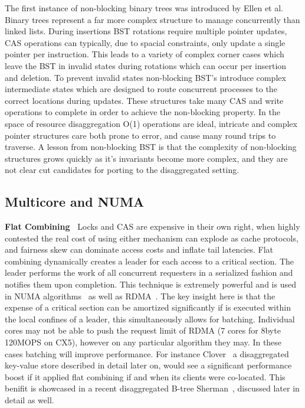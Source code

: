 The first instance of non-blocking binary trees was introduced by Ellen et al.
Binary trees represent a far more complex structure to manage concurrently than
linked lists. During insertions BST rotations require multiple pointer updates,
CAS operations can typically, due to spacial constraints, only update a single
pointer per instruction. This leads to a variety of complex corner cases which
leave the BST in invalid states during rotations which can occur per insertion
and deletion. To prevent invalid states non-blocking BST's introduce complex
intermediate states which are designed to route concurrent processes to the
correct locations during updates. These structures take many CAS and write
operations to complete in order to achieve the non-blocking property. In the
space of resource disaggregation O(1) operations are ideal, intricate and
complex pointer structures care both prone to error, and cause many round trips
to traverse. A lesson from non-blocking BST is that the complexity of
non-blocking structures grows quickly as it's invariants become more complex,
and they are not clear cut candidates for porting to the disaggregated setting.


\subsection{Multicore and NUMA}

\textbf{Flat Combining~\cite{flat-combine}} Locks and CAS are expensive in their
own right, when highly contested the real cost of using either mechanism can
explode as cache protocols, and fairness skew can dominate access costs and
inflate tail latencies. Flat combining dynamically creates a leader for each
access to a critical section. The leader performs the work of all concurrent
requesters in a serialized fashion and notifies them upon completion. This
technique is extremely powerful and is used in NUMA
algorithms~\cite{black-box-numa} as well as RDMA~\cite{flock}. The key insight
here is that the expense of a critical section can be amortized significantly if
is executed within the local confines of a leader, this simultaneously allows
for batching. Individual cores may not be able to push the request limit of RDMA
(7 cores for 8byte 120MOPS on CX5), however on any particular algorithm they
may. In these cases batching will improve performance. For instance 
Clover~\cite{clover} a disaggregated key-value store described in detail later
on, would see a significant performance boost if it applied flat combining if
and when its clients were co-located. This benifit is showcased in a recent
disaggregated B-tree Sherman~\cite{sherman}, discussed later in detail as well.

